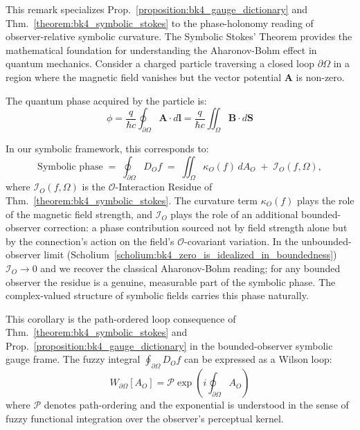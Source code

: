 \begin{remark}
\label{remark:bk4_aharonov_bohm}
This remark specializes Prop.~\ref{proposition:bk4_gauge_dictionary} and Thm.~\ref{theorem:bk4_symbolic_stokes} to the phase-holonomy reading of observer-relative symbolic curvature.
The Symbolic Stokes' Theorem provides the mathematical foundation for understanding the Aharonov-Bohm effect in quantum mechanics. Consider a charged particle traversing a closed loop $\partial\Omega$ in a region where the magnetic field vanishes but the vector potential $\mathbf{A}$ is non-zero.

The quantum phase acquired by the particle is:
\[
\phi = \frac{q}{\hbar c} \oint_{\partial\Omega} \mathbf{A} \cdot d\mathbf{l} = \frac{q}{\hbar c} \iint_\Omega \mathbf{B} \cdot d\mathbf{S}
\]

In our symbolic framework, this corresponds to:
\[
\text{Symbolic phase} \;=\; \oint_{\partial\Omega} D_O f \;=\; \iint_\Omega \kappa_O(f) \, dA_O \;+\; \mathcal{I}_O(f,\Omega),
\]
where $\mathcal{I}_O(f,\Omega)$ is the $\mathcal{O}$-Interaction Residue of Thm.~\ref{theorem:bk4_symbolic_stokes}. The curvature term $\kappa_O(f)$ plays the role of the magnetic field strength, and $\mathcal{I}_O$ plays the role of an additional bounded-observer correction: a phase contribution sourced not by field strength alone but by the connection's action on the field's $\mathcal{O}$-covariant variation. In the unbounded-observer limit (Scholium~\ref{scholium:bk4_zero_is_idealized_in_boundedness}) $\mathcal{I}_O \to 0$ and we recover the classical Aharonov-Bohm reading; for any bounded observer the residue is a genuine, measurable part of the symbolic phase. The complex-valued structure of symbolic fields carries this phase naturally.
\end{remark}

\begin{corollary}
\label{corollary:bk4_wilson_loop}
This corollary is the path-ordered loop consequence of Thm.~\ref{theorem:bk4_symbolic_stokes} and Prop.~\ref{proposition:bk4_gauge_dictionary} in the bounded-observer symbolic gauge frame.
The fuzzy integral $\oint_{\partial\Omega} D_O f$ can be expressed as a Wilson loop:
\[
W_{\partial\Omega}[A_O] = \mathcal{P} \exp\left(i \oint_{\partial\Omega} A_O\right)
\]
where $\mathcal{P}$ denotes path-ordering and the exponential is understood in the sense of fuzzy functional integration over the observer's perceptual kernel.
\end{corollary}

